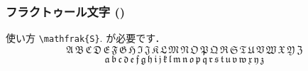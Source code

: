 \subsubsection{フラクトゥール文字 ()}
使い方 \verb'\mathfrak{S}'. が必要です．
\[
\mathfrak{A}\,\mathfrak{B}\,\mathfrak{C}\,\mathfrak{D}\,\mathfrak{E}
\,\mathfrak{F}\,\mathfrak{G}\,\mathfrak{H}\,\mathfrak{I}\,\mathfrak{J}
\,\mathfrak{K}\,\mathfrak{L}\,\mathfrak{M}\,\mathfrak{N}\,\mathfrak{O}
\,\mathfrak{P}\,\mathfrak{Q}\,\mathfrak{R}\,\mathfrak{S}\,\mathfrak{T}
\,\mathfrak{U}\,\mathfrak{V}\,\mathfrak{W}\,\mathfrak{X}\,\mathfrak{Y}
\,\mathfrak{Z}
\]
\[
\mathfrak{a}\,\mathfrak{b}\,\mathfrak{c}\,\mathfrak{d}\,\mathfrak{e}
\,\mathfrak{f}\,\mathfrak{g}\,\mathfrak{h}\,\mathfrak{i}\,\mathfrak{j}
\,\mathfrak{k}\,\mathfrak{l}\,\mathfrak{m}\,\mathfrak{n}\,\mathfrak{o}
\,\mathfrak{p}\,\mathfrak{q}\,\mathfrak{r}\,\mathfrak{s}\,\mathfrak{t}
\,\mathfrak{u}\,\mathfrak{v}\,\mathfrak{w}\,\mathfrak{x}\,\mathfrak{y}
\,\mathfrak{z}
\]


